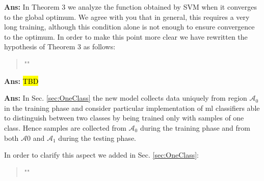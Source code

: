 \documentclass[draftcls,onecolumn,12pt]{IEEEtran}
\newcounter{revc}
\newcommand{\revp}[1]{\zref[revcontent]{#1}}
\begin{document}
\vspace{5mm} %

\begin{framed}
\end{framed}

{\bf Ans:} In Theorem 3 we analyze the function obtained by SVM when it converges to the global optimum. We agree with you that in general, this requires a very long training, although this condition alone is not enough to ensure convergence to the optimum. In order to make this point more clear we have rewritten the hypothesis of Theorem 3 as follows:
\begin{quote}
    "\revp{revGO}"
\end{quote}

\vspace{5mm} %
\begin{framed}
\end{framed}

{\bf Ans:} \hl{TBD}


\vspace{5mm} %
\begin{framed}
\end{framed}

{\bf Ans:} In Sec. \ref{sec:OneClass} the new model collects data uniquely from region $\mathcal{A}_0$ in the training phase and consider particular implementation of \ac{ml} classifiers able to distinguish between two classes by being trained only with samples of one class. Hence samples are collected from $\mathcal{A}_0$ during the training phase and from both $\mathcal{A}0$ and $\mathcal{A}_1$ during the testing phase. 

In order to clarify this aspect we added in Sec. \ref{sec:OneClass}:
\begin{quote}
"\revp{oneClass}"
\end{quote}
\end{document}
